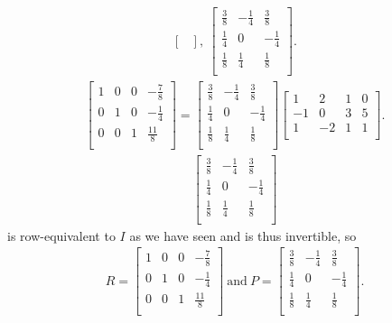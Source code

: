 \documentclass[12pt]{article}
\begin{document}
\begin{enumerate}
\begin{align*}
\begin{bmatrix}
      \end{bmatrix},\
      \begin{bmatrix}
        \frac{3}{8}  & -\frac{1}{4} & \frac{3}{8}\\
        \frac{1}{4} & 0 & -\frac{1}{4}\\
        \frac{1}{8} & \frac{1}{4} & \frac{1}{8}\\
      \end{bmatrix}.
    \end{align*}
    \begin{align*}
      \begin{bmatrix}
        1  & 0  & 0  & -\frac{7}{8}\\
        0  & 1  & 0  & -\frac{1}{4}\\
        0  & 0  & 1  & \frac{11}{8}\\
      \end{bmatrix}
      =
      \begin{bmatrix}
        \frac{3}{8}  & -\frac{1}{4} & \frac{3}{8}\\
        \frac{1}{4} & 0 & -\frac{1}{4}\\
        \frac{1}{8} & \frac{1}{4} & \frac{1}{8}\\
      \end{bmatrix}
      \begin{bmatrix}
        1  & 2  & 1 & 0\\
        -1 & 0  & 3 & 5\\
        1  & -2 & 1 & 1\\
      \end{bmatrix}.
    \end{align*}
    \begin{align*}
      \begin{bmatrix}
        \frac{3}{8}  & -\frac{1}{4} & \frac{3}{8}\\
        \frac{1}{4} & 0 & -\frac{1}{4}\\
        \frac{1}{8} & \frac{1}{4} & \frac{1}{8}\\
      \end{bmatrix}
    \end{align*}
    is row-equivalent to $I$ as we have seen and is thus
    invertible, so
    \begin{align*}
      R =
      \begin{bmatrix}
        1  & 0  & 0  & -\frac{7}{8}\\
        0  & 1  & 0  & -\frac{1}{4}\\
        0  & 0  & 1  & \frac{11}{8}\\
      \end{bmatrix}\ \text{and}\
      P =
      \begin{bmatrix}
        \frac{3}{8}  & -\frac{1}{4} & \frac{3}{8}\\
        \frac{1}{4} & 0 & -\frac{1}{4}\\
        \frac{1}{8} & \frac{1}{4} & \frac{1}{8}\\
      \end{bmatrix}.
    \end{align*}


\end{enumerate}
\end{document}
